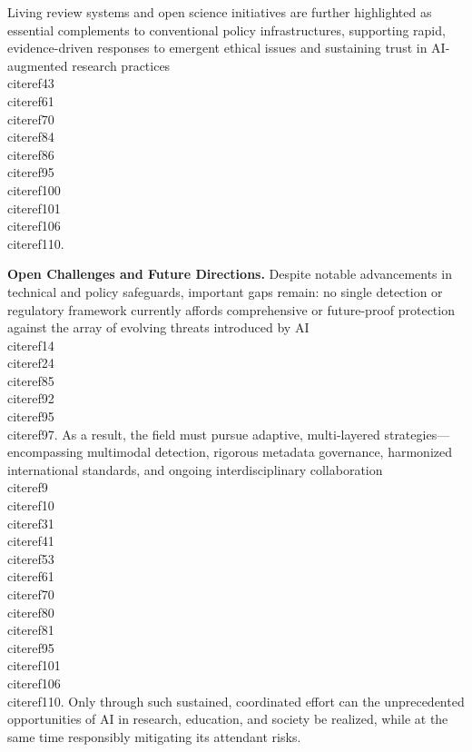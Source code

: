\documentclass[11pt]{article}
\begin{document}
Living review systems and open science initiatives are further highlighted as essential complements to conventional policy infrastructures, supporting rapid, evidence-driven responses to emergent ethical issues and sustaining trust in AI-augmented research practices \\cite{ref43}\\cite{ref61}\\cite{ref70}\\cite{ref84}\\cite{ref86}\\cite{ref95}\\cite{ref100}\\cite{ref101}\\cite{ref106}\\cite{ref110}.

\textbf{Open Challenges and Future Directions.}  
Despite notable advancements in technical and policy safeguards, important gaps remain: no single detection or regulatory framework currently affords comprehensive or future-proof protection against the array of evolving threats introduced by AI \\cite{ref14}\\cite{ref24}\\cite{ref85}\\cite{ref92}\\cite{ref95}\\cite{ref97}. As a result, the field must pursue adaptive, multi-layered strategies—encompassing multimodal detection, rigorous metadata governance, harmonized international standards, and ongoing interdisciplinary collaboration \\cite{ref9}\\cite{ref10}\\cite{ref31}\\cite{ref41}\\cite{ref53}\\cite{ref61}\\cite{ref70}\\cite{ref80}\\cite{ref81}\\cite{ref95}\\cite{ref101}\\cite{ref106}\\cite{ref110}. Only through such sustained, coordinated effort can the unprecedented opportunities of AI in research, education, and society be realized, while at the same time responsibly mitigating its attendant risks.
\end{document}
